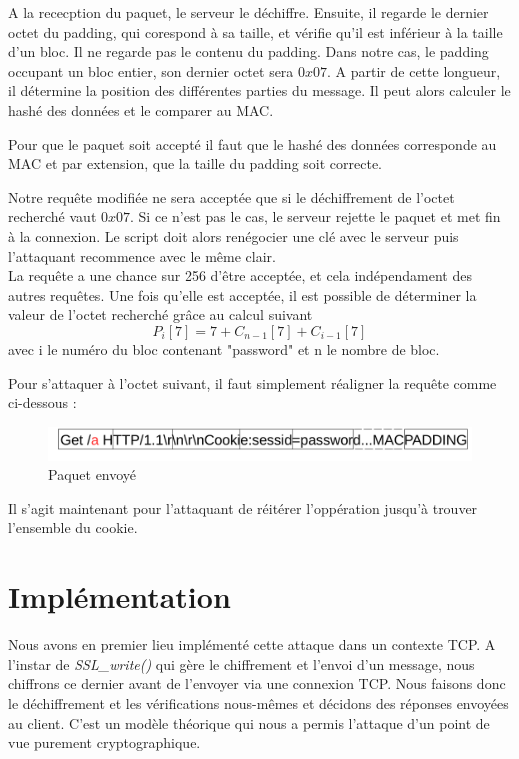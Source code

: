  A la rececption du paquet, le serveur le déchiffre. Ensuite, il regarde le dernier octet du padding, qui corespond
à sa taille, et vérifie qu'il est inférieur à la taille d'un bloc. Il ne regarde pas le contenu du padding.
Dans notre cas, le padding occupant un bloc entier, son dernier octet sera $0x07$. A partir de cette longueur, 
il détermine la position des différentes parties du message. Il peut alors calculer le hashé des données et le comparer au MAC.

Pour que le paquet soit accepté il faut que le hashé des données corresponde au MAC et par extension, que la taille 
du padding soit correcte.

Notre requête modifiée ne sera acceptée que si le déchiffrement de l'octet recherché vaut $0x07$. Si ce n'est pas 
le cas, le serveur rejette le paquet et met fin à la connexion. Le script doit alors renégocier une clé avec le
serveur puis l'attaquant recommence avec le même clair.\\

 La requête a une chance sur 256 d'être acceptée, et cela indépendament des autres requêtes. Une fois qu'elle est
acceptée, il est possible de déterminer la valeur de l'octet recherché grâce au calcul suivant
\[ P_i[7] = 7 + C_{n-1}[7] + C_{i-1}[7] \]
avec i le numéro du bloc contenant "password" et n le nombre de bloc.

Pour s'attaquer à l'octet suivant, il faut simplement réaligner la requête comme ci-dessous :

\begin{figure}[h]
\label{fig:packet2}
\centering
\includegraphics[scale=0.5]{Packet2}
\caption{Paquet envoyé}
\end{figure}

Il s'agit maintenant pour l'attaquant de réitérer l'oppération jusqu'à trouver l'ensemble du cookie.

\section{Implémentation}
\label{sec:imp}

Nous avons en premier lieu implémenté cette attaque dans un contexte TCP. A l'instar de \emph{SSL\_write()} qui gère le 
chiffrement et l'envoi d'un message, nous chiffrons ce dernier avant de l'envoyer via une connexion TCP.
Nous faisons donc le déchiffrement et les vérifications nous-mêmes et décidons des réponses envoyées au client.
C'est un modèle théorique qui nous a permis l'attaque d'un point de vue purement cryptographique. \\



